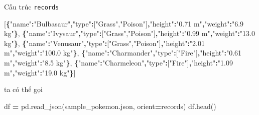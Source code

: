 \documentclass[
]{book}
\newenvironment{Shaded}{\begin{snugshade}}{\end{snugshade}}
\newcommand{\DataTypeTok}[1]{\textcolor[rgb]{0.13,0.29,0.53}{#1}}
\newcommand{\FunctionTok}[1]{\textcolor[rgb]{0.13,0.29,0.53}{\textbf{#1}}}
\newcommand{\NormalTok}[1]{#1}
\newcommand{\OperatorTok}[1]{\textcolor[rgb]{0.81,0.36,0.00}{\textbf{#1}}}
\newcommand{\OtherTok}[1]{\textcolor[rgb]{0.56,0.35,0.01}{#1}}
\newcommand{\StringTok}[1]{\textcolor[rgb]{0.31,0.60,0.02}{#1}}
\begin{document}
Cấu trúc \texttt{records}

\begin{Shaded}
\begin{Highlighting}[]
\OtherTok{[}\FunctionTok{\{}\DataTypeTok{"name"}\FunctionTok{:}\StringTok{"Bulbasaur"}\FunctionTok{,}\DataTypeTok{"type"}\FunctionTok{:}\OtherTok{[}\StringTok{"Grass"}\OtherTok{,}\StringTok{"Poison"}\OtherTok{]}\FunctionTok{,}\DataTypeTok{"height"}\FunctionTok{:}\StringTok{"0.71 m"}\FunctionTok{,}\DataTypeTok{"weight"}\FunctionTok{:}\StringTok{"6.9 kg"}\FunctionTok{\}}\OtherTok{,}
 \FunctionTok{\{}\DataTypeTok{"name"}\FunctionTok{:}\StringTok{"Ivysaur"}\FunctionTok{,}\DataTypeTok{"type"}\FunctionTok{:}\OtherTok{[}\StringTok{"Grass"}\OtherTok{,}\StringTok{"Poison"}\OtherTok{]}\FunctionTok{,}\DataTypeTok{"height"}\FunctionTok{:}\StringTok{"0.99 m"}\FunctionTok{,}\DataTypeTok{"weight"}\FunctionTok{:}\StringTok{"13.0 kg"}\FunctionTok{\}}\OtherTok{,}
 \FunctionTok{\{}\DataTypeTok{"name"}\FunctionTok{:}\StringTok{"Venusaur"}\FunctionTok{,}\DataTypeTok{"type"}\FunctionTok{:}\OtherTok{[}\StringTok{"Grass"}\OtherTok{,}\StringTok{"Poison"}\OtherTok{]}\FunctionTok{,}\DataTypeTok{"height"}\FunctionTok{:}\StringTok{"2.01 m"}\FunctionTok{,}\DataTypeTok{"weight"}\FunctionTok{:}\StringTok{"100.0 kg"}\FunctionTok{\}}\OtherTok{,}
 \FunctionTok{\{}\DataTypeTok{"name"}\FunctionTok{:}\StringTok{"Charmander"}\FunctionTok{,}\DataTypeTok{"type"}\FunctionTok{:}\OtherTok{[}\StringTok{"Fire"}\OtherTok{]}\FunctionTok{,}\DataTypeTok{"height"}\FunctionTok{:}\StringTok{"0.61 m"}\FunctionTok{,}\DataTypeTok{"weight"}\FunctionTok{:}\StringTok{"8.5 kg"}\FunctionTok{\}}\OtherTok{,}
 \FunctionTok{\{}\DataTypeTok{"name"}\FunctionTok{:}\StringTok{"Charmeleon"}\FunctionTok{,}\DataTypeTok{"type"}\FunctionTok{:}\OtherTok{[}\StringTok{"Fire"}\OtherTok{]}\FunctionTok{,}\DataTypeTok{"height"}\FunctionTok{:}\StringTok{"1.09 m"}\FunctionTok{,}\DataTypeTok{"weight"}\FunctionTok{:}\StringTok{"19.0 kg"}\FunctionTok{\}}\OtherTok{]}
\end{Highlighting}
\end{Shaded}

ta có thể gọi

\begin{Shaded}
\begin{Highlighting}[]
\NormalTok{df }\OperatorTok{=}\NormalTok{ pd.read\_json(}\StringTok{\textquotesingle{}sample\_pokemon.json\textquotesingle{}}\NormalTok{, orient}\OperatorTok{=}\StringTok{\textquotesingle{}records\textquotesingle{}}\NormalTok{)}
\NormalTok{df.head()}
\end{Highlighting}
\end{Shaded}
\end{document}
